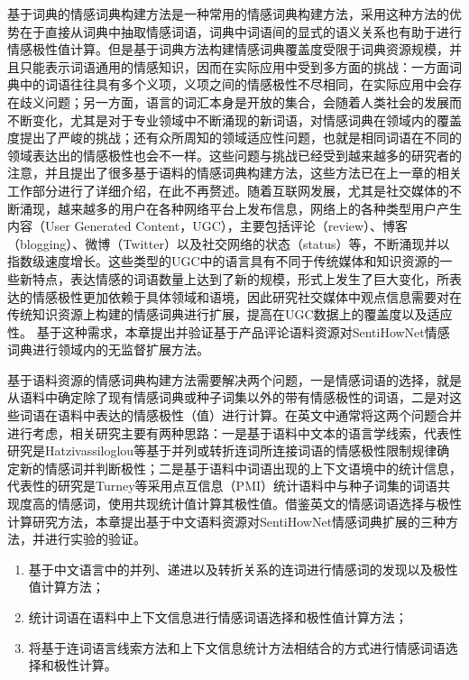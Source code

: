 基于词典的情感词典构建方法是一种常用的情感词典构建方法，采用这种方法的优势在于直接从词典中抽取情感词语，词典中词语间的显式的语义关系也有助于进行情感极性值计算。但是基于词典方法构建情感词典覆盖度受限于词典资源规模，并且只能表示词语通用的情感知识，因而在实际应用中受到多方面的挑战：一方面词典中的词语往往具有多个义项，义项之间的情感极性不尽相同，在实际应用中会存在歧义问题；另一方面，语言的词汇本身是开放的集合，会随着人类社会的发展而不断变化，尤其是对于专业领域中不断涌现的新词语，对情感词典在领域内的覆盖度提出了严峻的挑战；还有众所周知的领域适应性问题，也就是相同词语在不同的领域表达出的情感极性也会不一样。这些问题与挑战已经受到越来越多的研究者的注意，并且提出了很多基于语料的情感词典构建方法，这些方法已在上一章的相关工作部分进行了详细介绍，在此不再赘述。随着互联网发展，尤其是社交媒体的不断涌现，越来越多的用户在各种网络平台上发布信息，网络上的各种类型用户产生内容（User Generated Content，UGC），主要包括评论（review）、博客（blogging）、微博（Twitter）以及社交网络的状态（status）等，不断涌现并以指数级速度增长。这些类型的UGC中的语言具有不同于传统媒体和知识资源的一些新特点，表达情感的词语数量上达到了新的规模，形式上发生了巨大变化，所表达的情感极性更加依赖于具体领域和语境，因此研究社交媒体中观点信息需要对在传统知识资源上构建的情感词典进行扩展，提高在UGC数据上的覆盖度以及适应性。
基于这种需求，本章提出并验证基于产品评论语料资源对SentiHowNet情感词典进行领域内的无监督扩展方法。

基于语料资源的情感词典构建方法需要解决两个问题，一是情感词语的选择，就是从语料中确定除了现有情感词典或种子词集以外的带有情感极性的词语，二是对这些词语在语料中表达的情感极性（值）进行计算。在英文中通常将这两个问题合并进行考虑，相关研究主要有两种思路：一是基于语料中文本的语言学线索，代表性研究是Hatzivassiloglou等基于并列或转折连词所连接词语的情感极性限制规律确定新的情感词并判断极性；二是基于语料中词语出现的上下文语境中的统计信息，代表性的研究是Turney等采用点互信息（PMI）统计语料中与种子词集的词语共现度高的情感词，使用共现统计值计算其极性值。借鉴英文的情感词语选择与极性计算研究方法，本章提出基于中文语料资源对SentiHowNet情感词典扩展的三种方法，并进行实验的验证。
\begin{enumerate}
\item 基于中文语言中的并列、递进以及转折关系的连词进行情感词的发现以及极性值计算方法；
\item 统计词语在语料中上下文信息进行情感词语选择和极性值计算方法；
\item 将基于连词语言线索方法和上下文信息统计方法相结合的方式进行情感词语选择和极性计算。
\end{enumerate}


